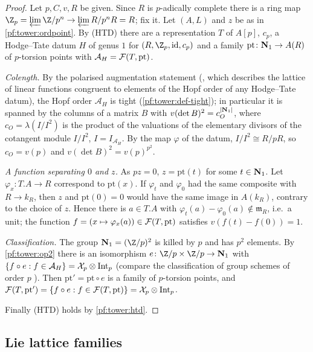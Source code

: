 \begin{proof}
Let $p,C,v,R$ be given. Since $R$ is $p$-adically complete there is a ring map
$\Z_p=\varprojlim\Z/p^n\to\varprojlim R/p^nR=R$; fix it. Let $(A,L)$ and $z$ be as
in \cref{pf:tower:ordpoint}. By (HTD) there are a representation $T$ of $A[p]$, $c_p$, a Hodge--Tate datum $H$
of genus $1$ for $(R,\Z_p,\mathrm{id},c_p)$ and a family $\mathrm{pt}\colon\mathbf N_1\to A(R)$ of $p$-torsion
points with $\mathcal A_H=\mathcal F(T,\mathrm{pt})$.

\emph{Colength.} By the polarised augmentation statement
(, which describes the lattice of linear functions
congruent to elements of the Hopf order of any Hodge--Tate datum), the Hopf order $\mathcal A_H$ is tight
(\cref{pf:tower:def-tight}); in particular it is spanned by the columns of a matrix $B$ with $v(\det B)^2=c_O^{|\mathbf N_1|}$,
where $c_O=\lambda(I/I^2)$ is the product of the valuations of the elementary divisors of the cotangent module $I/I^2$,
$I=I_{\mathcal A_H}$.
By the map $\varphi$ of the datum, $I/I^2\cong R/pR$, so $c_O=v(p)$ and
$v(\det B)^2=v(p)^{p^2}$.

\emph{A function separating $0$ and $z$.} As $pz=0$, $z=\mathrm{pt}(t)$ for some $t\in\mathbf N_1$. Let
$\varphi_x\colon T.A\to R$ correspond to $\mathrm{pt}(x)$. If $\varphi_t$ and $\varphi_0$ had the same
composite with $R\to k_R$, then $z$ and $\mathrm{pt}(0)=0$ would have the same image in $A(k_R)$, contrary to
the choice of $z$. Hence there is $a\in T.A$ with $\varphi_t(a)-\varphi_0(a)\notin\mathfrak m_R$, i.e.\ a unit;
the function $f=(x\mapsto\varphi_x(a))\in\mathcal F(T,\mathrm{pt})$ satisfies $v(f(t)-f(0))=1$.

\emph{Classification.} The group $\towerNb_1=(\Z/p)^2$ is killed by $p$ and has $p^2$ elements. By \cref{pf:tower:op2}
there is an isomorphism $e\colon\Z/p\times\Z/p\to\towerNb_1$ with $\{f\circ e:f\in\mathcal A_H\}=\mathcal X_p\otimes\mathrm{Int}_p$
(compare the classification of group schemes of order $p$ \cite{TateOort1970}). Then $\mathrm{pt}'=\mathrm{pt}\circ e$ is a family of $p$-torsion points, and
$\mathcal F(T,\mathrm{pt}')=\{f\circ e:f\in\mathcal F(T,\mathrm{pt})\}=\mathcal X_p\otimes\mathrm{Int}_p$.

Finally (HTD) holds by \cref{pf:tower:htd}.
\end{proof}

\subsection{Lie lattice families}\label{pf:tower:sec-fam}

